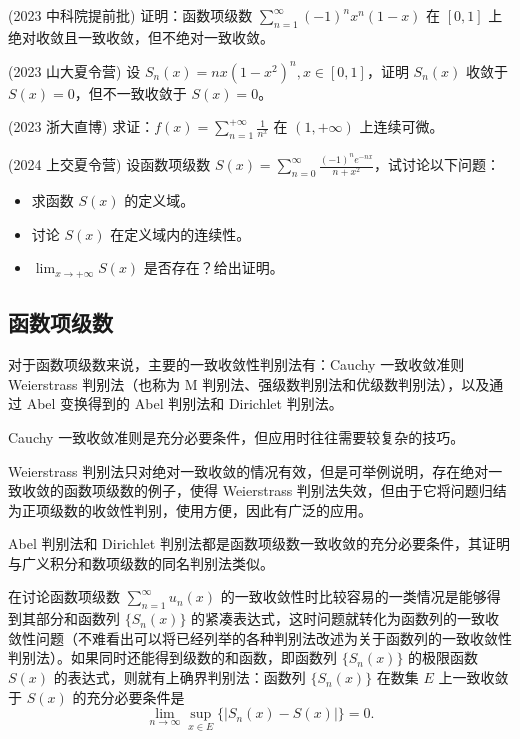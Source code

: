 \documentclass[lang=cn,10pt,thmcnt=section]{elegantbook}
\begin{document}
	\begin{example}
	(2023 中科院提前批) 证明：函数项级数 $\sum_{n=1}^{\infty} (-1)^n x^n (1-x)$ 在 $[0,1]$ 上绝对收敛且一致收敛，但不绝对一致收敛。
	\end{example}
	
	\begin{example}
	(2023 山大夏令营) 设 $S_n(x) = nx(1-x^2)^n, x \in [0,1]$，证明 $S_n(x)$ 收敛于 $S(x) = 0$，但不一致收敛于 $S(x) = 0$。
	\end{example}
	
	\begin{example}
	(2023 浙大直博) 求证：$f(x) = \sum_{n=1}^{+\infty} \frac{1}{n^x}$ 在 $(1, +\infty)$ 上连续可微。
	\end{example}
	
	\begin{example}
	(2024 上交夏令营) 设函数项级数 $S(x) = \sum_{n=0}^{\infty} \frac{(-1)^n e^{-nx}}{n+x^2}$，试讨论以下问题：
	\begin{itemize}
		\item 求函数 $S(x)$ 的定义域。
		\item 讨论 $S(x)$ 在定义域内的连续性。
		\item $\lim_{x \to +\infty} S(x)$ 是否存在？给出证明。
	\end{itemize}
	\end{example}
	
\subsection{函数项级数}
对于函数项级数来说，主要的一致收敛性判别法有：Cauchy 一致收敛准则 Weierstrass 判别法（也称为 M 判别法、强级数判别法和优级数判别法），以及通过 Abel 变换得到的 Abel 判别法和 Dirichlet 判别法。

Cauchy 一致收敛准则是充分必要条件，但应用时往往需要较复杂的技巧。

Weierstrass 判别法只对绝对一致收敛的情况有效，但是可举例说明，存在绝对一致收敛的函数项级数的例子，使得 Weierstrass 判别法失效，但由于它将问题归结为正项级数的收敛性判别，使用方便，因此有广泛的应用。

Abel 判别法和 Dirichlet 判别法都是函数项级数一致收敛的充分必要条件，其证明与广义积分和数项级数的同名判别法类似。

在讨论函数项级数 $\sum_{n=1}^{\infty} u_n(x)$ 的一致收敛性时比较容易的一类情况是能够得到其部分和函数列 $\{S_n(x)\}$ 的紧凑表达式，这时问题就转化为函数列的一致收敛性问题（不难看出可以将已经列举的各种判别法改述为关于函数列的一致收敛性判别法）。如果同时还能得到级数的和函数，即函数列 $\{S_n(x)\}$ 的极限函数 $S(x)$ 的表达式，则就有上确界判别法：函数列 $\{S_n(x)\}$ 在数集 $E$ 上一致收敛于 $S(x)$ 的充分必要条件是
\[
\lim_{n \to \infty} \sup_{x \in E} \{|S_n(x) - S(x)|\} = 0.
\]
\end{document}
